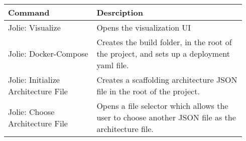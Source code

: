 \begin{table}[h]
    \begin{tabular}{p{0.35\linewidth} | p{0.592\linewidth}}
    \toprule
    \textbf{Command} & \textbf{Desrciption} \\\midrule
    Jolie: Visualize & Opens the visualization UI \\\midrule
    Jolie: Docker-Compose & Creates the build folder, in the root of the project, and sets up a deployment yaml file. \\\midrule
    Jolie: Initialize Architecture File & Creates a scaffolding architecture JSON file in the root of the project.   \\\midrule
    Jolie: Choose Architecture File & Opens a file selector which allows the user to choose another JSON file as the architecture file. \\\midrule
    \end{tabular}
    \end{table}